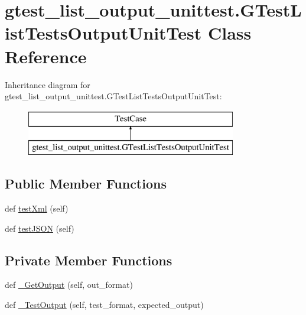 \hypertarget{classgtest__list__output__unittest_1_1_g_test_list_tests_output_unit_test}{}\section{gtest\+\_\+list\+\_\+output\+\_\+unittest.\+G\+Test\+List\+Tests\+Output\+Unit\+Test Class Reference}
\label{classgtest__list__output__unittest_1_1_g_test_list_tests_output_unit_test}
Inheritance diagram for gtest\+\_\+list\+\_\+output\+\_\+unittest.\+G\+Test\+List\+Tests\+Output\+Unit\+Test\+:\begin{figure}[H]
\begin{center}
\leavevmode
\includegraphics[height=2.000000cm]{d7/d03/classgtest__list__output__unittest_1_1_g_test_list_tests_output_unit_test}
\end{center}
\end{figure}
\subsection*{Public Member Functions}
\begin{DoxyCompactItemize}
\item 
def \mbox{\hyperlink{classgtest__list__output__unittest_1_1_g_test_list_tests_output_unit_test_ad3088bc8ee3a0abdabbf1b90507e272e}{test\+Xml}} (self)
\item 
def \mbox{\hyperlink{classgtest__list__output__unittest_1_1_g_test_list_tests_output_unit_test_a99bc0627a969b4c7b63ed91e8f187637}{test\+J\+S\+ON}} (self)
\end{DoxyCompactItemize}
\subsection*{Private Member Functions}
\begin{DoxyCompactItemize}
\item 
def \mbox{\hyperlink{classgtest__list__output__unittest_1_1_g_test_list_tests_output_unit_test_a1b4015d0e1778e9d51e8e6c0e4e2a509}{\+\_\+\+Get\+Output}} (self, out\+\_\+format)
\item 
def \mbox{\hyperlink{classgtest__list__output__unittest_1_1_g_test_list_tests_output_unit_test_aa55917904d9c888f566fbf5cac1e63ac}{\+\_\+\+Test\+Output}} (self, test\+\_\+format, expected\+\_\+output)
\end{DoxyCompactItemize}


